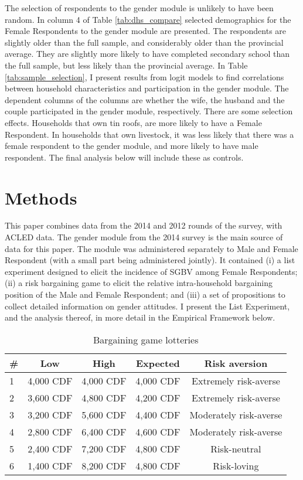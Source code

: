 The selection of respondents to the gender module is unlikely to have been random. In column 4 of Table \ref{tab:dhs_compare} selected demographics for the Female Respondents to the gender module are presented. The respondents are slightly older than the full sample, and considerably older than the provincial average. They are slightly more likely to have completed secondary school than the full sample, but less likely than the provincial average. In Table \ref{tab:sample_selection}, I present results from logit models to find correlations between household characteristics and participation in the gender module. The dependent columns of the columns are whether the wife, the husband and the couple participated in the gender module, respectively. There are some selection effects. Households that own tin roofs, are more likely to have a Female Respondent. In households that own livestock, it was less likely that there was a female respondent to the gender module, and more likely to have male respondent. The final analysis below will include these as controls.

\section{Methods}
This paper combines data from the 2014 and 2012 rounds of the survey, with ACLED data. The gender module from the 2014 survey is the main source of data for this paper. The module was administered separately to Male and Female Respondent (with a small part being administered jointly). It contained (i) a list experiment designed to elicit the incidence of SGBV among Female Respondents; (ii) a risk bargaining game to elicit the relative intra-household bargaining position of the Male and Female Respondent; and (iii) a set of propositions to collect detailed information on gender attitudes. I present the List Experiment, and the analysis thereof, in more detail in the Empirical Framework below. 

\begin{table}[htb]
	\centering
	\caption{Bargaining game lotteries}
	\label{tab:bargaining}
	\begin{tabular}{l c c c c}
	\toprule
	\# & Low & High & Expected & Risk aversion \\
	\hline
	1 & 4,000 CDF & 4,000 CDF & 4,000 CDF & Extremely risk-averse \\
	2 & 3,600 CDF & 4,800 CDF & 4,200 CDF & Extremely risk-averse \\
	3 & 3,200 CDF & 5,600 CDF & 4,400 CDF & Moderately risk-averse \\
	4 & 2,800 CDF & 6,400 CDF & 4,600 CDF & Moderately risk-averse \\
	5 & 2,400 CDF & 7,200 CDF & 4,800 CDF & Risk-neutral \\
	6 & 1,400 CDF & 8,200 CDF & 4,800 CDF & Risk-loving \\ 
	\bottomrule
	\end{tabular}
\end{table}

